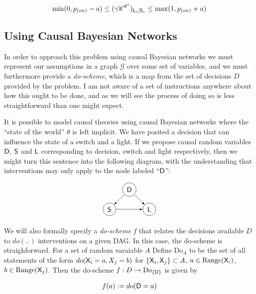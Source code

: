 \begin{align}
\mathrm{min}(0,p_{(on)}-a) \leq (\gamma\mathscr{C}^{\theta^*})_{\mathsf{L}_c|\mathsf{S}_c} \leq \mathrm{max}(1,p_{(on)}+a) \label{eq:three_decisions}
\end{align}


\subsection{Using Causal Bayesian Networks}

In order to approach this problem using causal Bayesian networks we must represent our assumptions in a graph $\mathcal{G}$ over some set of variables, and we must furthermore provide a \emph{do-scheme}, which is a map from the set of decisions $D$ provided by the problem. I am not aware of a set of instructions anywhere about how this ought to be done, and as we will see the process of doing so is less straightforward than one might expect.

It is possible to model causal theories using causal Bayesian networks where the ``state of the world'' $\theta$ is left implicit. We have posited a decision that can influence the state of a switch and a light. If we propose causal random variables $\mathsf{D}$, $\mathsf{S}$ and $\mathsf{L}$ corresponding to decision, switch and light respectively, then we might turn this sentence into the following diagram, with the understanding that interventions may only apply to the node labeled ``$\mathsf{D}$'':

\begin{align}
\begin{tikzpicture}[-latex]
\path (0,0) node[draw,circle] (D) {$\RV{D}$}
++(-1,-1) node[draw,circle] (S) {$\RV{S}$}
++(2,0) node[draw,circle] (L) {$\RV{L}$};
\draw (D) -- (S);
\draw (S) -- (L);
\draw (D) -- (L);
\end{tikzpicture}\label{dia:d_influences_both}
\end{align}

We will also formally specify a \emph{do-scheme} $f$ that relates the decisions available $D$ to $do(..)$ interventions on a given DAG. In this case, the do-scheme is straighforward. For a set of random varaiable $A$ Define $\mathrm{Do}_{A}$ to be the set of all statements of the form $do(\mathsf{X}_i=a,X_j=b)$ for $\{\mathsf{X}_i,\mathsf{X}_j\}\subset A$, $a\in \mathrm{Range}(\mathsf{X}_i)$, $b\in \mathrm{Range}(\mathsf{X}_j)$. Then the do-scheme $f:D\to \mathrm{Do}_{\{\mathsf{D}\}}$ is given by

\begin{align}
	f(a) := do(\mathsf{D}=a) \label{eq:do_scheme_trivial}
\end{align}

